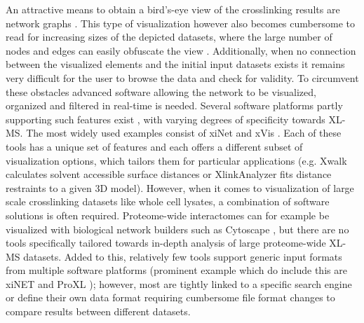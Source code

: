 An attractive means to obtain a bird’s-eye view of the crosslinking results are network graphs \cite{shannon2003cytoscape:, cline2007integration, bastian2009gephi:}. This type of visualization however also becomes cumbersome to read for increasing sizes of the depicted datasets, where the large number of nodes and edges can easily obfuscate the view \cite{agapito2013visualization}. Additionally, when no connection between the visualized elements and the initial input datasets exists it remains very difficult for the user to browse the data and check for validity. To circumvent these obstacles advanced software allowing the network to be visualized, organized and filtered in real-time is needed. Several software platforms partly supporting such features exist \cite{courcelles2017clmsvault:, heymann2008msx-, kahraman2011xwalk:, kosinski2015xlink, lima2015sim-xl:, riffle2016proxl, schweppe2015xlmap:, schweppe2016xlinkdb, solis-mezarino2017complexview:}, with varying degrees of specificity towards XL-MS. The most widely used examples consist of xiNet \cite{combe2015xinet:} and xVis \cite{grimm2015xvis:}. Each of these tools has a unique set of features and each offers a different subset of visualization options, which tailors them for particular applications (e.g. Xwalk \cite{kahraman2011xwalk:} calculates solvent accessible surface distances or XlinkAnalyzer \cite{kosinski2015xlink} fits distance restraints to a given 3D model). However, when it comes to visualization of large scale crosslinking datasets like whole cell lysates, a combination of software solutions is often required. Proteome-wide interactomes can for example be visualized with biological network builders such as Cytoscape \cite{shannon2003cytoscape:, cline2007integration}, but there are no tools specifically tailored towards in-depth analysis of large proteome-wide XL-MS datasets. Added to this, relatively few tools support generic input formats from multiple software platforms (prominent example which do include this are xiNET \cite{combe2015xinet:} and ProXL \cite{riffle2016proxl} ); however, most are tightly linked to a specific search engine or define their own data format requiring cumbersome file format changes to compare results between different datasets.
